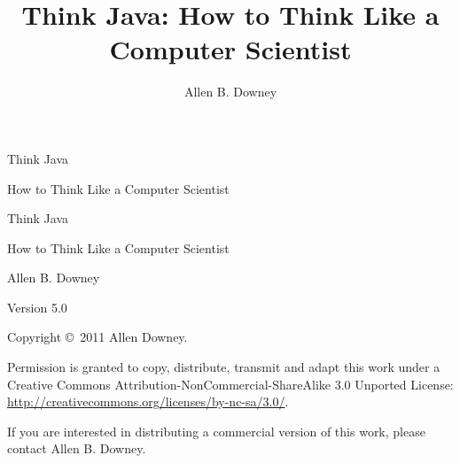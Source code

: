 \documentclass{book}
\title{Think Java: How to Think Like a Computer Scientist}
\author{Allen B. Downey}
\newcommand{\clearemptydoublepage}{\newpage{\pagestyle{empty}\cleardoublepage}}
\begin{document}
\frontmatter




\thispagestyle{empty}

\begin{flushright}
\vspace*{2.5in}

{\huge Think Java}

\vspace{1in}

{\LARGE How to Think Like a Computer Scientist}

\vfill

\end{flushright}


\cleardoublepage

\pagebreak
\thispagestyle{empty}

\begin{flushright}
\vspace*{2.5in}

{\huge Think Java}

\vspace{0.25in}

{\LARGE How to Think Like a Computer Scientist}

\vspace{1in}

{\Large
Allen B. Downey
}


\vspace{1in}

{\Large Version 5.0}

\vfill

\end{flushright}


\pagebreak
\thispagestyle{empty}

Copyright \copyright ~2011 Allen Downey.

\vspace{0.25in}

Permission is granted to copy, distribute, transmit and adapt
this work under a Creative Commons 
Attribution-NonCommercial-ShareAlike 3.0 Unported License:
\url{http://creativecommons.org/licenses/by-nc-sa/3.0/}.

If you are interested in distributing a commercial version of this
work, please contact Allen B. Downey.
\end{document}
